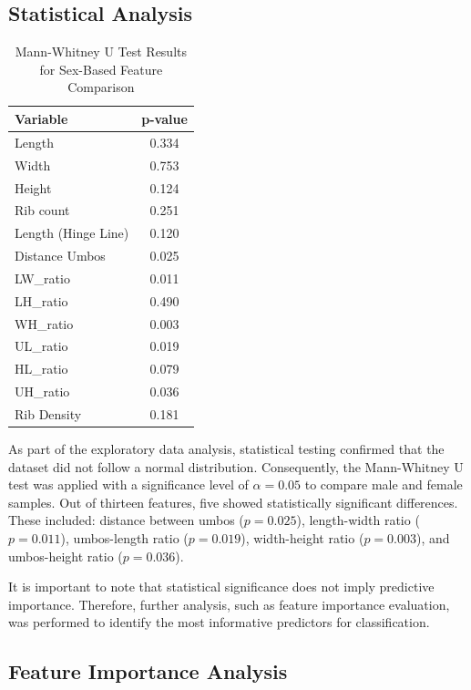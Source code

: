 \subsection{Statistical Analysis}

\begin{table}[H]
	\centering
	\small %
	\begin{tabular}{lc}
		\hline
		\textbf{Variable} & \textbf{p-value} \\ \hline
		Length & 0.334 \\
		Width & 0.753 \\
		Height & 0.124 \\
		Rib count & 0.251 \\
		Length (Hinge Line) & 0.120 \\
		Distance Umbos & 0.025 \\
		LW\_ratio & 0.011 \\
		LH\_ratio & 0.490 \\
		WH\_ratio & 0.003 \\
		UL\_ratio & 0.019 \\
		HL\_ratio & 0.079 \\
		UH\_ratio & 0.036 \\
		Rib Density & 0.181 \\ \hline
	\end{tabular}
	\caption{Mann-Whitney U Test Results for Sex-Based Feature Comparison}
	\label{tab:mann-whitney}
\end{table}

As part of the exploratory data analysis, statistical testing confirmed that the dataset did not follow a normal distribution. Consequently, the Mann-Whitney U test was applied with a significance level of $\alpha = 0.05$ to compare male and female samples. Out of thirteen features, five showed statistically significant differences. These included: distance between umbos ($p = 0.025$), length-width ratio ($p = 0.011$), umbos-length ratio ($p = 0.019$), width-height ratio ($p = 0.003$), and umbos-height ratio ($p = 0.036$). 

It is important to note that statistical significance does not imply predictive importance. Therefore, further analysis, such as feature importance evaluation, was performed to identify the most informative predictors for classification.

\subsection{Feature Importance Analysis}

